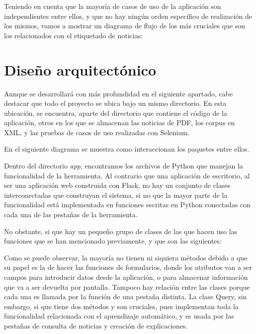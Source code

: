 Teniendo en cuenta que la mayoría de casos de uso de la aplicación son independientes entre ellos, y que no hay ningún orden específico de realización de los mismos, vamos a mostrar un diagrama de flujo de los más cruciales que son los relacionados con el etiquetado de noticias:


\section{Diseño arquitectónico}

Aunque se desarrollará con más profundidad en el siguiente apartado, cabe destacar que todo el proyecto se ubica bajo un mismo directorio. En esta ubicación, se encuentra, aparte del directorio que contiene el código de la aplicación, otros en los que se almacenan las noticias de PDF, los corpus en XML, y las pruebas de casos de uso realizadas con Selenium.

En el siguiente diagrama se muestra como interaccionan los paquetes entre ellos.



Dentro del directorio \emph{app}, encontramos los archivos de Python que manejan la funcionalidad de la herramienta. Al contrario que una aplicación de escritorio, al ser una aplicación web construida con Flask, no hay un conjunto de clases interconectadas que construyan el sistema, si no que la mayor parte de la funcionalidad está implementada en funciones escritas en Python conectadas con cada una de las pestañas de la herramienta.

No obstante, si que hay un pequeño grupo de clases de las que hacen uso las funciones que se han mencionado previamente, y que son las siguientes:


Como se puede observar, la mayoría no tienen ni siquiera métodos debido a que su papel es la de hacer las funciones de formularios, donde los atributos van a ser campos para introducir datos desde la aplicación, o para almacenar información que va a ser devuelta por pantalla. Tampoco hay relación entre las clases porque cada una es llamada por la función de una pestaña distinta. La clase Query, sin embargo, si que tiene dos métodos y son cruciales, pues implementan toda la funcionalidad relacionada con el aprendizaje automático, y es usada por las pestañas de consulta de noticias y creación de explicaciones.